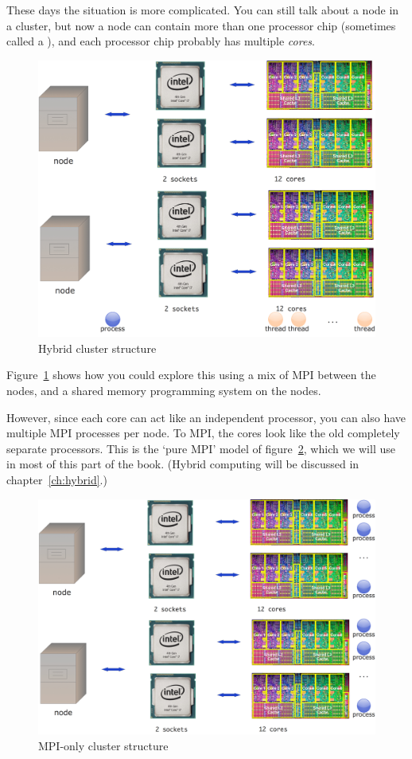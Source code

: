 These days the situation is more complicated.
You can still talk about a node in a cluster, but now a node can contain
more than one processor chip (sometimes called a ),
and each processor chip probably has multiple
\emph{cores}.
%
\begin{figure}[ht]
  \includegraphics[scale=.11]{graphics/mpi-node3}
  \caption{Hybrid cluster structure}
  \label{fig:hybridmpi}
\end{figure}
%
Figure~\ref{fig:hybridmpi} shows how you could explore this using a mix
of MPI between the nodes, and a shared memory programming system on the nodes.

However, since each core can act like an independent processor,
you can also have multiple MPI processes per node. To MPI, the cores look
like the old completely separate processors. This is the `pure MPI'
model of figure~\ref{fig:purempi}, which we will use in most of this part
of the book. (Hybrid computing will be discussed in chapter~\ref{ch:hybrid}.)
%
\begin{figure}[ht]
  \includegraphics[scale=.11]{graphics/mpi-node2}
  \caption{MPI-only cluster structure}
  \label{fig:purempi}
\end{figure}
%

